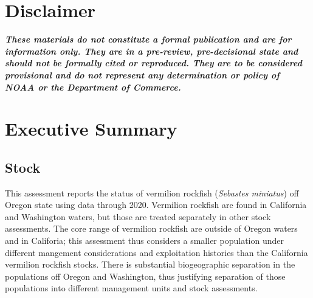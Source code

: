 \documentclass[11pt,
  english,
  a4paper,
]{article}
\begin{document}
\newcommand{\lt}{\ensuremath <}
\newcommand{\gt}{\ensuremath >}

\vspace{500cm}


\hypertarget{disclaimer}{%
\section*{Disclaimer}\label{disclaimer}}

\leavevmode\tagmcend\tagstructend


\emph{\textbf{These materials do not constitute a formal publication and are for information only. They are in a pre-review, pre-decisional state and should not be formally cited or reproduced. They are to be considered provisional and do not represent any determination or policy of NOAA or the Department of Commerce.}}

\leavevmode\tagmcend\tagstructend\par

\pagebreak
{}
\setcounter{page}{1}

\renewcommand{\thetable}{\roman{table}}
\renewcommand{\thefigure}{\roman{figure}}

\setlength\parskip{0.5em plus 0.1em minus 0.2em}


\hypertarget{executive-summary}{%
\section*{Executive Summary}\label{executive-summary}}

\leavevmode\tagmcend\tagstructend


\hypertarget{stock}{%
\subsection*{Stock}\label{stock}}

\leavevmode\tagmcend\tagstructend


This assessment reports the status of vermilion rockfish (\emph{Sebastes miniatus}) off Oregon state using data through 2020. Vermilion rockfish are found in California and Washington waters, but those are treated separately in other stock assessments. The core range of vermilion rockfish are outside of Oregon waters and in Califoria; this assessment thus considers a smaller population under different mangement considerations and exploitation histories than the California vermilion rockfish stocks. There is substantial biogeographic separation in the populations off Oregon and Washington, thus justifying separation of those populations into different management units and stock assessments.
\end{document}
